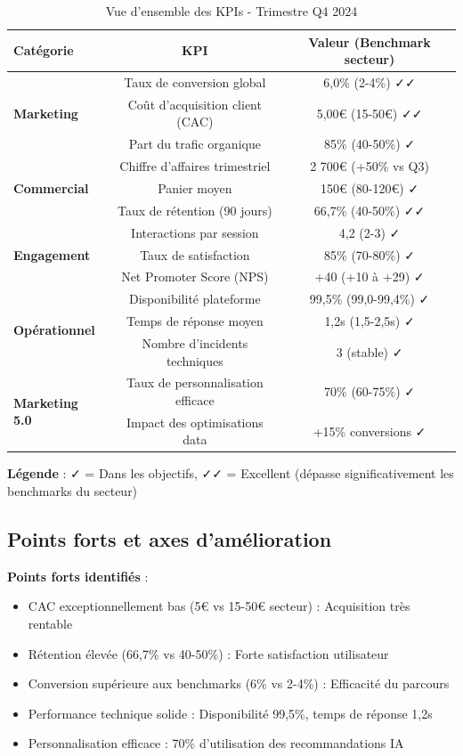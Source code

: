 \begin{table}[H]
\centering
\caption{Vue d'ensemble des KPIs - Trimestre Q4 2024}
\label{tab:dashboard-kpis}
\small
\begin{tabular}{|l|c|c|}
\hline
\textbf{Catégorie} & \textbf{KPI} & \textbf{Valeur (Benchmark secteur)} \\
\hline
\multirow{3}{*}{\textbf{Marketing}} & Taux de conversion global & 6,0\% (2-4\%) ✓✓ \\
\cline{2-3}
 & Coût d'acquisition client (CAC) & 5,00€ (15-50€) ✓✓ \\
\cline{2-3}
 & Part du trafic organique & 85\% (40-50\%) ✓ \\
\hline
\multirow{3}{*}{\textbf{Commercial}} & Chiffre d'affaires trimestriel & 2 700€ (+50\% vs Q3) \\
\cline{2-3}
 & Panier moyen & 150€ (80-120€) ✓ \\
\cline{2-3}
 & Taux de rétention (90 jours) & 66,7\% (40-50\%) ✓✓ \\
\hline
\multirow{3}{*}{\textbf{Engagement}} & Interactions par session & 4,2 (2-3) ✓ \\
\cline{2-3}
 & Taux de satisfaction & 85\% (70-80\%) ✓ \\
\cline{2-3}
 & Net Promoter Score (NPS) & +40 (+10 à +29) ✓ \\
\hline
\multirow{3}{*}{\textbf{Opérationnel}} & Disponibilité plateforme & 99,5\% (99,0-99,4\%) ✓ \\
\cline{2-3}
 & Temps de réponse moyen & 1,2s (1,5-2,5s) ✓ \\
\cline{2-3}
 & Nombre d'incidents techniques & 3 (stable) ✓ \\
\hline
\multirow{2}{*}{\textbf{Marketing 5.0}} & Taux de personnalisation efficace & 70\% (60-75\%) ✓ \\
\cline{2-3}
 & Impact des optimisations data & +15\% conversions ✓ \\
\hline
\end{tabular}
\end{table}

\textbf{Légende} : ✓ = Dans les objectifs, ✓✓ = Excellent (dépasse significativement les benchmarks du secteur)

\subsection{Points forts et axes d'amélioration}

\textbf{Points forts identifiés} :
\begin{itemize}
    \item CAC exceptionnellement bas (5€ vs 15-50€ secteur) : Acquisition très rentable
    \item Rétention élevée (66,7\% vs 40-50\%) : Forte satisfaction utilisateur
    \item Conversion supérieure aux benchmarks (6\% vs 2-4\%) : Efficacité du parcours
    \item Performance technique solide : Disponibilité 99,5\%, temps de réponse 1,2s
    \item Personnalisation efficace : 70\% d'utilisation des recommandations IA
\end{itemize}

